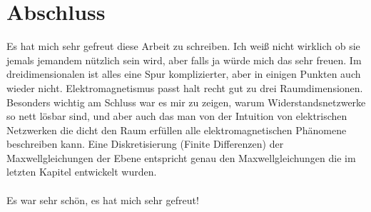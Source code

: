 \documentclass[11pt,a4paper,leqno]{report}
\numberwithin{equation}{chapter}
\begin{document}
\chapter*{Abschluss}
Es hat mich sehr gefreut diese Arbeit zu schreiben. Ich wei\ss{} nicht wirklich ob sie jemals jemandem n\"utzlich sein wird, aber falls ja w\"urde mich das sehr freuen. Im dreidimensionalen ist alles eine Spur komplizierter, aber in einigen Punkten auch wieder nicht. Elektromagnetismus passt halt recht gut zu drei Raumdimensionen. Besonders wichtig am Schluss war es mir zu zeigen, warum Widerstandsnetzwerke so nett l\"osbar sind, und aber auch das man von der Intuition von elektrischen Netzwerken die dicht den Raum erf\"ullen alle elektromagnetischen Ph\"anomene beschreiben kann. Eine Diskretisierung (Finite Differenzen) der Maxwellgleichungen der Ebene entspricht genau den Maxwellgleichungen die im letzten Kapitel entwickelt wurden. \\
\\
Es war sehr sch\"on, es hat mich sehr gefreut!
\end{document}

